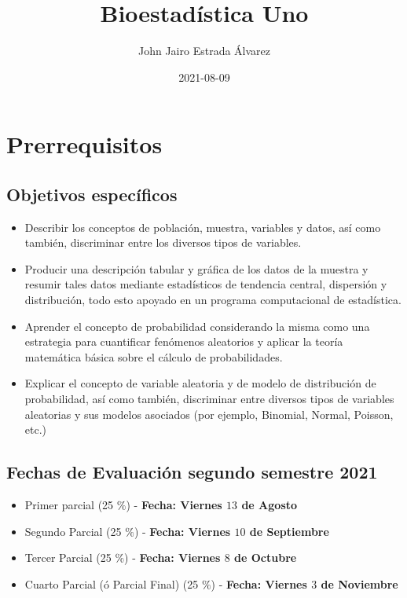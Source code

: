 \documentclass[
]{book}
\title{Bioestadística Uno}
\author{John Jairo Estrada Álvarez}
\date{2021-08-09}
\providecommand{\tightlist}{%
  \setlength{\itemsep}{0pt}\setlength{\parskip}{0pt}}
\theoremstyle{definition}
\theoremstyle{definition}
\theoremstyle{definition}
\theoremstyle{definition}
\theoremstyle{remark}
\begin{document}
\maketitle

{
\setcounter{tocdepth}{1}
\tableofcontents
}
\hypertarget{prerrequisitos}{%
\chapter{Prerrequisitos}\label{prerrequisitos}}

\hypertarget{objetivos-especuxedficos}{%
\section{Objetivos específicos}\label{objetivos-especuxedficos}}

\begin{itemize}
\tightlist
\item
  Describir los conceptos de población, muestra, variables y datos, así como también,
  discriminar entre los diversos tipos de variables.
\item
  Producir una descripción tabular y gráfica de los datos de la muestra y resumir tales datos
  mediante estadísticos de tendencia central, dispersión y distribución, todo esto apoyado en
  un programa computacional de estadística.
\item
  Aprender el concepto de probabilidad considerando la misma como una estrategia para
  cuantificar fenómenos aleatorios y aplicar la teoría matemática básica sobre el cálculo de
  probabilidades.
\item
  Explicar el concepto de variable aleatoria y de modelo de distribución de probabilidad, así
  como también, discriminar entre diversos tipos de variables aleatorias y sus modelos
  asociados (por ejemplo, Binomial, Normal, Poisson, etc.)
\end{itemize}

\hypertarget{fechas-de-evaluaciuxf3n-segundo-semestre-2021}{%
\section{Fechas de Evaluación segundo semestre 2021}\label{fechas-de-evaluaciuxf3n-segundo-semestre-2021}}

\begin{itemize}
\item
  Primer parcial (25 \(\%\)) - \textbf{Fecha: Viernes \(13\) de Agosto}
\item
  Segundo Parcial (25 \(\%\)) - \textbf{Fecha: Viernes \(10\) de Septiembre}
\item
  Tercer Parcial (25 \(\%\)) - \textbf{Fecha: Viernes \(8\) de Octubre}
\item
  Cuarto Parcial (ó Parcial Final) (25 \(\%\)) - \textbf{Fecha: Viernes \(3\) de Noviembre}
\end{itemize}
\end{document}
